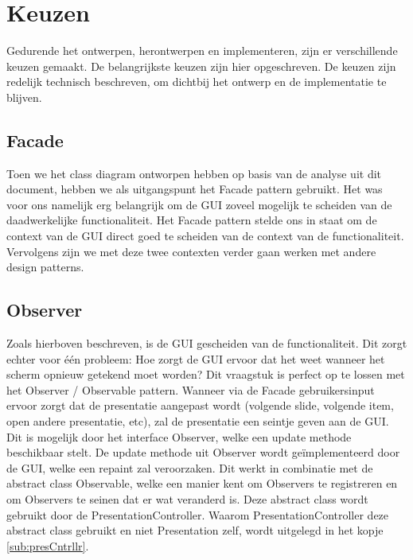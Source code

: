 \documentclass[a4paper]{article}
\newcommand{\1}[0]{\'{e}\'{e}n}
\begin{document}
\section{Keuzen}
\label{sec:keuzen}
Gedurende het ontwerpen, herontwerpen en implementeren, zijn er verschillende keuzen gemaakt. De belangrijkste keuzen zijn hier opgeschreven. De keuzen zijn redelijk technisch beschreven, om dichtbij het ontwerp en de implementatie te blijven.

\subsection{Facade}
Toen we het class diagram ontworpen hebben op basis van de analyse uit dit document, hebben we als uitgangspunt het Facade pattern gebruikt. Het was voor ons namelijk erg belangrijk om de GUI zoveel mogelijk te scheiden van de daadwerkelijke functionaliteit. Het Facade pattern stelde ons in staat om de context van de GUI direct goed te scheiden van de context van de functionaliteit. Vervolgens zijn we met deze twee contexten verder gaan werken met andere design patterns.

\subsection{Observer}
Zoals hierboven beschreven, is de GUI gescheiden van de functionaliteit. Dit zorgt echter voor \1 probleem: Hoe zorgt de GUI ervoor dat het weet wanneer het scherm opnieuw getekend moet worden? Dit vraagstuk is perfect op te lossen met het Observer / Observable pattern. Wanneer via de Facade gebruikersinput ervoor zorgt dat de presentatie aangepast wordt (volgende slide, volgende item, open andere presentatie, etc), zal de presentatie een seintje geven aan de GUI. Dit is mogelijk door het interface Observer, welke een update methode beschikbaar stelt. De update methode uit Observer wordt ge\"{i}mplementeerd door de GUI, welke een repaint zal veroorzaken. Dit werkt in combinatie met de abstract class Observable, welke een manier kent om Observers te registreren en om Observers te seinen dat er wat veranderd is. Deze abstract class wordt gebruikt door de PresentationController. Waarom PresentationController deze abstract class gebruikt en niet Presentation zelf, wordt uitgelegd in het kopje \ref{sub:presCntrllr}.
\end{document}
